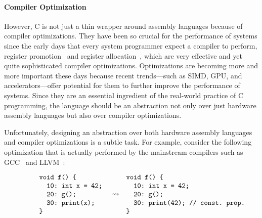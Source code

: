 \paragraph{Compiler Optimization}

However, C is not just a thin wrapper around assembly languages because of compiler optimizations.
They have been so crucial for the performance of systems since the early days that every system
programmer expect a compiler to perform, \eg{} register promotion~\cite{reg-prom} and register
allocation~\cite{reg-alloc}, which are very effective and yet quite sophisticated compiler
optimizations.  Optimizations are becoming more and more important these days because recent
trends---such as SIMD, GPU, and accelerators---offer potential for them to further improve the
performance of systems.  Since they are an essential ingredient of the real-world practice of C
programming, the language should be an abstraction not only over just hardware assembly languages
but also over compiler optimizations.



Unfortunately, designing an abstraction over both hardware assembly languages and compiler
optimizations is a subtle task.  For example, consider the following optimization that is actually
performed by the mainstream compilers such as GCC~\cite{gcc} and LLVM~\cite{llvm}:

\[\begin{array}{rcl}
\begin{minipage}{0.27\textwidth}
\begin{verbatim}
void f() {
  10: int x = 42;
  20: g();
  30: print(x);
}
\end{verbatim}
\end{minipage}
&
\optarrow
&
\begin{minipage}{0.4\textwidth}
\begin{verbatim}
void f() {
  10: int x = 42;
  20: g();
  30: print(42); // const. prop.
}
\end{verbatim}
\end{minipage}
\end{array}\]

